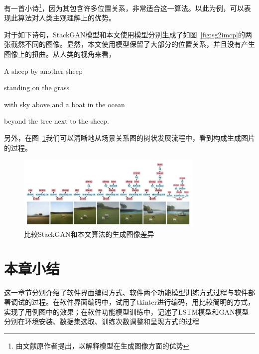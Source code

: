 有一首小诗\footnote{由文献\cite{Johnson_2018}原作者提出，以解释模型在生成图像方面的优势}，因为其包含许多位置关系，非常适合这一算法。以此为例，可以表现此算法对人类主观理解上的优势。

对于如下诗句，StackGAN模型和本文使用模型分别生成了如图~\ref{fig:sg2imcp}的两张截然不同的图像。显然，本文使用模型保留了大部分的位置关系，并且没有产生图像上的扭曲。从人类的视角来看，

A sheep by another sheep

standing on the grass

with sky above and a boat in the ocean

beyond the tree next to the sheep.

另外，在图~\ref{fig:sg2imeg}我们可以清晰地从场景关系图的树状发展流程中，看到构成生成图片的过程。

\begin{figure}[!htbp]
    \centering
    \includegraphics[width=0.8\textwidth]{figures/sg2imeg.png}
    \caption{比较StackGAN和本文算法的生成图像差异}
    \label{fig:sg2imeg}
\end{figure}

\section{本章小结}
这一章节分别介绍了软件界面编码方式、软件两个功能模型训练方式过程与软件部署调试的过程。在软件界面编码中，试用了tkinter进行编码，用比较简明的方式，实现了用例图中的效果；在软件功能模型训练中，记述了LSTM模型和GAN模型分别在环境安装、数据集选取、训练次数调整和呈现方式的过程




